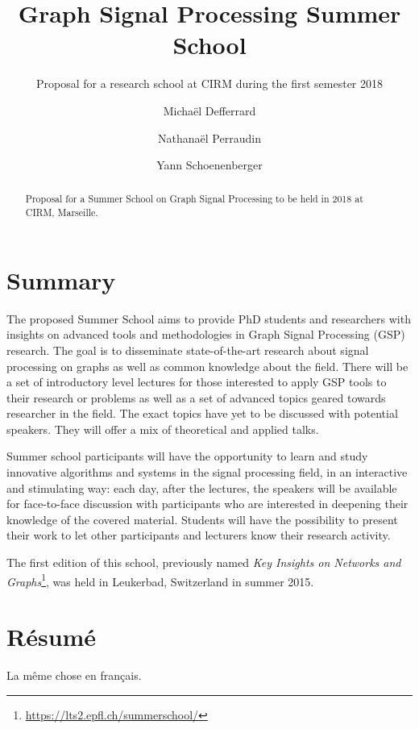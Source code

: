 \documentclass[a4paper]{scrartcl}
\begin{document}
\title{Graph Signal Processing Summer School}
\subtitle{Proposal for a research school at CIRM during the first semester 2018}
\author{
	Michaël Defferrard \and
	Nathanaël Perraudin \and
	Yann Schoenenberger \and
}
\maketitle

\begin{abstract}
	Proposal for a Summer School on Graph Signal Processing to be held in 2018
	at CIRM, Marseille.
\end{abstract}

\section{Summary}

The proposed Summer School aims to provide PhD students and researchers with
insights on advanced tools and methodologies in Graph Signal Processing (GSP)
research. The goal is to disseminate state-of-the-art research about signal
processing on graphs as well as common knowledge about the field.
There will be a set of introductory level lectures for those interested to apply
GSP tools to their research or problems as well as a set of advanced topics
geared towards researcher in the field. The exact topics have yet to be
discussed with potential speakers. They will offer a mix of theoretical and
applied talks.

Summer school participants will have the opportunity to learn and study
innovative algorithms and systems in the signal processing field, in an
interactive and stimulating way: each day, after the lectures, the speakers will
be available for face-to-face discussion with participants who are interested in
deepening their knowledge of the covered material. Students will have the
possibility to present their work to let other participants and lecturers know
their research activity.

The first edition of this school, previously named \textit{Key Insights on
Networks and Graphs}\footnote{\url{https://lts2.epfl.ch/summerschool/}}, was
held in Leukerbad, Switzerland in summer 2015.

\section{Résumé}

La même chose en français.
\end{document}
